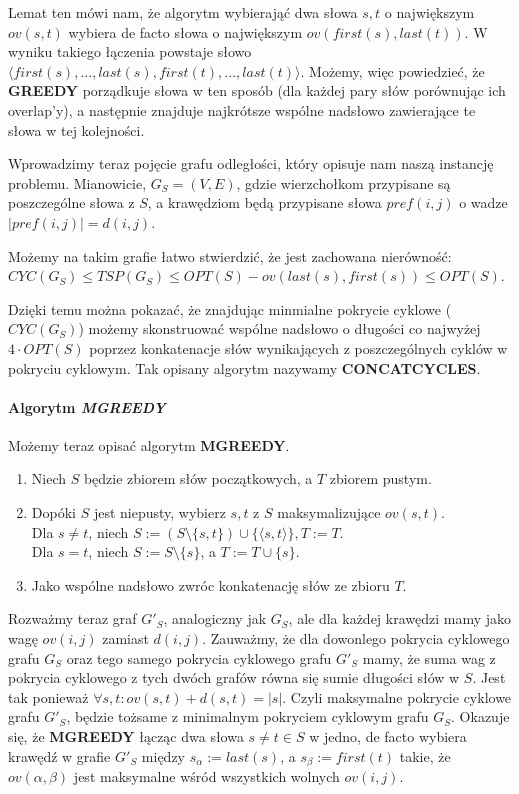 Lemat ten mówi nam, że algorytm wybierająć dwa słowa $s,t$ o największym $ov(s,t)$ wybiera de facto słowa o największym $ov(first(s), last(t))$.
W wyniku takiego łączenia powstaje słowo $\langle first(s),...,last(s),first(t),...,last(t)\rangle$.
Możemy, więc powiedzieć, że \textbf{GREEDY} porządkuje słowa w ten sposób (dla każdej pary słów porównując ich overlap'y), a następnie 
znajduje najkrótsze wspólne nadsłowo zawierające te słowa w tej kolejności.

Wprowadzimy teraz pojęcie grafu odległości, który opisuje nam naszą instancję problemu. Mianowicie,
$G_S = (V,E)$, gdzie wierzchołkom przypisane są poszczególne słowa z $S$, a krawędziom będą przypisane 
słowa $pref(i,j)$ o wadze $|pref(i,j)|=d(i,j)$.

Możemy na takim grafie łatwo stwierdzić, że jest zachowana nierówność: \linebreak
$CYC(G_S) \leq TSP(G_S) \leq OPT(S) - ov(last(s), first(s)) \leq OPT(S)$.

Dzięki temu można pokazać, że znajdując minmialne pokrycie cyklowe ($CYC(G_S)$) możemy skonstruować wspólne nadsłowo o długości co najwyżej $4 \cdot OPT(S)$ poprzez konkatenacje 
słów wynikających z poszczególnych cyklów w pokryciu cyklowym. Tak opisany algorytm nazywamy \textbf{CONCATCYCLES}.

\paragraph{Algorytm \textit{\textbf{MGREEDY}}}
Możemy teraz opisać algorytm \textbf{MGREEDY}.
\begin{enumerate}
  \item Niech $S$ będzie zbiorem słów początkowych, a $T$ zbiorem pustym.
  \item Dopóki $S$ jest niepusty, wybierz $s,t$ z $S$ maksymalizujące $ov(s,t)$.\\
  Dla $s\neq t$, niech $S := (S \setminus \{s, t\}) \cup \{\langle s, t \rangle\}, T := T$.\\
  Dla $s = t$, niech $S := S \setminus \{s\}$, a $T := T \cup \{s\}$. 
  \item Jako wspólne nadsłowo zwróc konkatenację słów ze zbioru $T$.
\end{enumerate}

Rozważmy teraz graf $G'_S$, analogiczny jak $G_S$, ale dla każdej krawędzi mamy jako wagę $ov(i,j)$ zamiast $d(i,j)$.
Zauważmy, że dla dowonlego pokrycia cyklowego grafu $G_S$ oraz tego samego pokrycia cyklowego grafu $G'_S$ mamy, że 
suma wag z pokrycia cyklowego z tych dwóch grafów równa się sumie długości słów w $S$. Jest tak ponieważ $\forall s,t: ov(s,t) + d(s,t) =  |s|$. Czyli maksymalne pokrycie cyklowe grafu $G'_S$, będzie tożsame z
minimalnym pokryciem cyklowym grafu $G_S$. Okazuje się, że \textbf{MGREEDY} łącząc dwa słowa $s\neq t \in S$ w jedno, de facto 
wybiera krawędź w grafie $G'_S$ między $s_\alpha := last(s)$, a $s_\beta := first(t)$ takie, że $ov(\alpha, \beta)$ jest maksymalne wśród wszystkich wolnych $ov(i,j)$.

